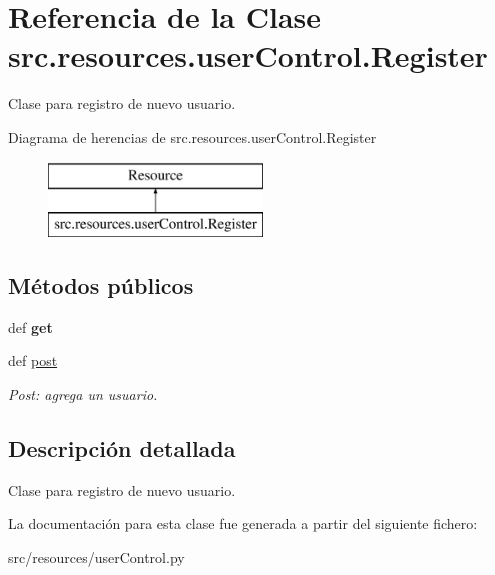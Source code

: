 \hypertarget{classsrc_1_1resources_1_1user_control_1_1_register}{\section{Referencia de la Clase src.\-resources.\-user\-Control.\-Register}
\label{classsrc_1_1resources_1_1user_control_1_1_register}
}


Clase para registro de nuevo usuario.  


Diagrama de herencias de src.\-resources.\-user\-Control.\-Register\begin{figure}[H]
\begin{center}
\leavevmode
\includegraphics[height=2.000000cm]{classsrc_1_1resources_1_1user_control_1_1_register}
\end{center}
\end{figure}
\subsection*{Métodos públicos}
\begin{DoxyCompactItemize}
\item 
\hypertarget{classsrc_1_1resources_1_1user_control_1_1_register_ab0152d9e570205ce75980bac6f7ced78}{def {\bfseries get}}\label{classsrc_1_1resources_1_1user_control_1_1_register_ab0152d9e570205ce75980bac6f7ced78}

\item 
\hypertarget{classsrc_1_1resources_1_1user_control_1_1_register_a0cb2055635160abfce69a9d8ce1f44a1}{def \hyperlink{classsrc_1_1resources_1_1user_control_1_1_register_a0cb2055635160abfce69a9d8ce1f44a1}{post}}\label{classsrc_1_1resources_1_1user_control_1_1_register_a0cb2055635160abfce69a9d8ce1f44a1}

\begin{DoxyCompactList}\small\item\em Post\-: agrega un usuario. \end{DoxyCompactList}\end{DoxyCompactItemize}


\subsection{Descripción detallada}
Clase para registro de nuevo usuario. 

La documentación para esta clase fue generada a partir del siguiente fichero\-:\begin{DoxyCompactItemize}
\item 
src/resources/user\-Control.\-py\end{DoxyCompactItemize}
